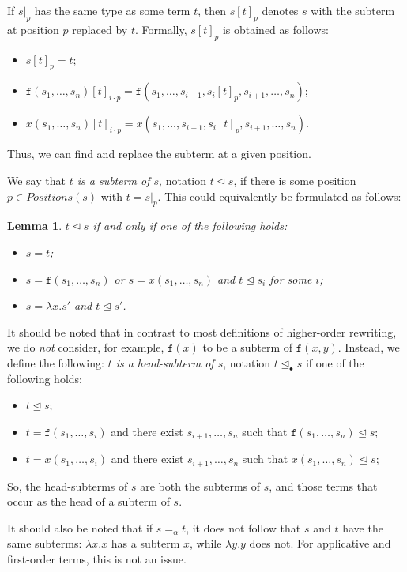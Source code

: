 \documentclass{lmcs}
\theoremstyle{theorem}\newtheorem{theorem}{Theorem}
\theoremstyle{theorem}\newtheorem{lemma}[theorem]{Lemma}
\theoremstyle{theorem}\newtheorem{corollary}[theorem]{Corollary}
\theoremstyle{definition}\newtheorem{definition}[theorem]{Definition}
\theoremstyle{definition}\newtheorem{example}[theorem]{Example}
\newcommand{\Positions}{\mathit{Positions}}
\newcommand{\identifier}[1]{\mathtt{#1}}
\newcommand{\afun}{\identifier{f}}
\newcommand{\avar}{x}
\newcommand{\abs}[2]{\lambda #1.#2}
\newcommand{\subtermeq}{\unlhd}
\newcommand{\headsubtermeq}{\unlhd_{\bullet}}
\begin{document}
If $s|_p$ has the same type as some term $t$, then $s[t]_p$ denotes $s$ with the subterm at position
$p$ replaced by $t$.  Formally, $s[t]_p$ is obtained as follows:
\begin{itemize}
\item $s[t]_p = t$;
\item $\afun(s_1,\dots,s_n)[t]_{i \cdot p} = \afun(s_1,\dots,s_{i-1},s_i[t]_p,s_{i+1},\dots,s_n)$;
\item $\avar(s_1,\dots,s_n)[t]_{i \cdot p} = \avar(s_1,\dots,s_{i-1},s_i[t]_p,s_{i+1},\dots,s_n)$.
\end{itemize}
Thus, we can find and replace the subterm at a given position.

We say that \emph{$t$ is a subterm of $s$}, notation $t \subtermeq s$, if there is some position
$p \in \Positions(s)$ with $t = s|_p$.  This could equivalently be formulated as follows:

\begin{lemma}
$t \subtermeq s$ if and only if one of the following holds:
\begin{itemize}
\item $s = t$;
\item $s = \afun(s_1,\dots,s_n)$ or $s = \avar(s_1,\dots,s_n)$ and $t \subtermeq s_i$ for some $i$;
\item $s = \abs{x}{s'}$ and $t \subtermeq s'$.
\end{itemize}
\end{lemma}

It should be noted that in contrast to most definitions of higher-order rewriting, we do \emph{not}
consider, for example, $\afun(x)$ to be a subterm of $\afun(x,y)$.  Instead, we define the
following: \emph{$t$ is a head-subterm of $s$}, notation $t \headsubtermeq s$ if one of the
following holds:
\begin{itemize}
\item $t \subtermeq s$;
\item $t = \afun(s_1,\dots,s_i)$ and there exist $s_{i+1},\dots,s_n$ such that
  $\afun(s_1,\dots,s_n) \subtermeq s$;
\item $t = \avar(s_1,\dots,s_i)$ and there exist $s_{i+1},\dots,s_n$ such that
  $\avar(s_1,\dots,s_n) \subtermeq s$;
\end{itemize}
So, the head-subterms of $s$ are both the subterms of $s$, and those terms that occur as the head
of a subterm of $s$.

It should also be noted that if $s =_\alpha t$, it does not follow that $s$ and $t$ have the same
subterms: $\abs{x}{x}$ has a subterm $x$, while $\abs{y}{y}$ does not.  For applicative and
first-order terms, this is not an issue.
\end{document}
